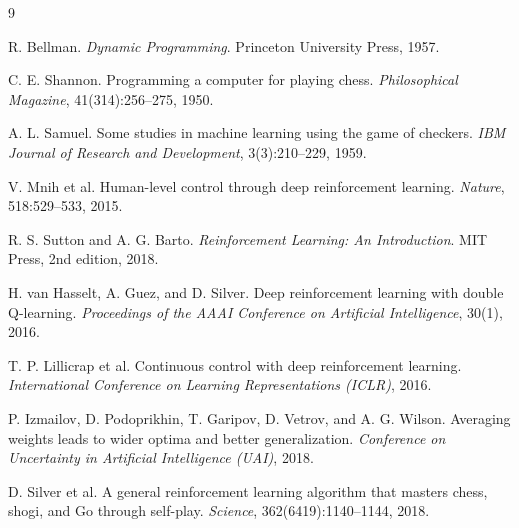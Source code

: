 \documentclass[11pt,a4paper]{article}
\begin{document}
\begin{thebibliography}{9}

R. Bellman.
\textit{Dynamic Programming}.
Princeton University Press, 1957.

C. E. Shannon.
Programming a computer for playing chess.
\textit{Philosophical Magazine}, 41(314):256--275, 1950.

A. L. Samuel.
Some studies in machine learning using the game of checkers.
\textit{IBM Journal of Research and Development}, 3(3):210--229, 1959.

V. Mnih et al.
Human-level control through deep reinforcement learning.
\textit{Nature}, 518:529--533, 2015.

R. S. Sutton and A. G. Barto.
\textit{Reinforcement Learning: An Introduction}.
MIT Press, 2nd edition, 2018.

H. van Hasselt, A. Guez, and D. Silver.
Deep reinforcement learning with double Q-learning.
\textit{Proceedings of the AAAI Conference on Artificial Intelligence}, 30(1), 2016.

T. P. Lillicrap et al.
Continuous control with deep reinforcement learning.
\textit{International Conference on Learning Representations (ICLR)}, 2016.

P. Izmailov, D. Podoprikhin, T. Garipov, D. Vetrov, and A. G. Wilson.
Averaging weights leads to wider optima and better generalization.
\textit{Conference on Uncertainty in Artificial Intelligence (UAI)}, 2018.

D. Silver et al.
A general reinforcement learning algorithm that masters chess, shogi, and Go through self-play.
\textit{Science}, 362(6419):1140--1144, 2018.

\end{thebibliography}
\end{document}
